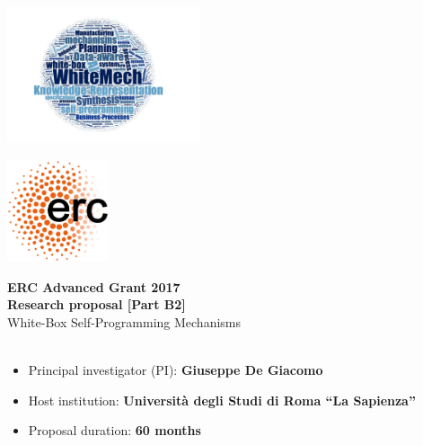 \hspace{-1cm}\includegraphics[height=4cm]{images/wordcloud-1} 

\vspace{-4cm}
\hfill 
\includegraphics[height=3cm]{images/European_Research_Council_logo}

\vspace{-2cm}
\begin{center}
  \vbox{\vspace{1.5cm}}
  \Large{\textbf{%
      ERC Advanced Grant 2017\\
      Research proposal [Part B2]\\}
  }
  \vspace{1cm}
  \huge{White-Box Self-Programming Mechanisms}\\
  \vspace{1cm}
  \huge{\project}\
  \vspace{1cm}
\end{center}

\begin{itemize}
\item Principal investigator (PI): \textbf{Giuseppe De Giacomo}
\item Host institution: \textbf{Universit\`a degli Studi di Roma ``La Sapienza''}
\item Proposal duration: \textbf{60 months}
\end{itemize}

\tableofcontents
\newpage

